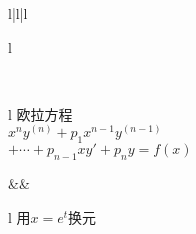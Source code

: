 \begin{table}[!htp]
\begin{tblr}{l|l|l}
\begin{tblr}{l}
			\end{tblr}
		\\ \hline
		\begin{tblr}{l}
			欧拉方程 \\ %
			\(x^n y^{(n)} + p_1 x^{n-1} y^{(n-1)}\) \\
			\(+ \dotsb + p_{n-1} x y' + p_n y = f(x)\) \\
		\end{tblr}
			&& \begin{tblr}{l}
				用\(x=e^t\)换元 \\
			\end{tblr}
		\\ \hline
	\end{tblr}
\end{table}
